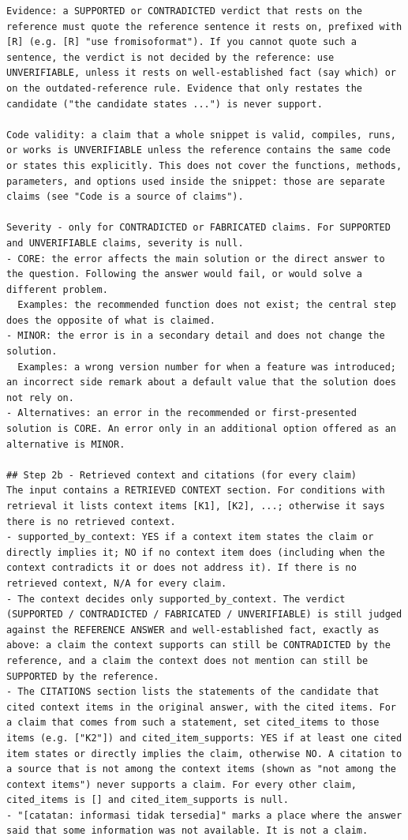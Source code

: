 \begin{lstlisting}
Evidence: a SUPPORTED or CONTRADICTED verdict that rests on the reference must quote the reference sentence it rests on, prefixed with [R] (e.g. [R] "use fromisoformat"). If you cannot quote such a sentence, the verdict is not decided by the reference: use UNVERIFIABLE, unless it rests on well-established fact (say which) or on the outdated-reference rule. Evidence that only restates the candidate ("the candidate states ...") is never support.

Code validity: a claim that a whole snippet is valid, compiles, runs, or works is UNVERIFIABLE unless the reference contains the same code or states this explicitly. This does not cover the functions, methods, parameters, and options used inside the snippet: those are separate claims (see "Code is a source of claims").

Severity - only for CONTRADICTED or FABRICATED claims. For SUPPORTED and UNVERIFIABLE claims, severity is null.
- CORE: the error affects the main solution or the direct answer to the question. Following the answer would fail, or would solve a different problem.
  Examples: the recommended function does not exist; the central step does the opposite of what is claimed.
- MINOR: the error is in a secondary detail and does not change the solution.
  Examples: a wrong version number for when a feature was introduced; an incorrect side remark about a default value that the solution does not rely on.
- Alternatives: an error in the recommended or first-presented solution is CORE. An error only in an additional option offered as an alternative is MINOR.

## Step 2b - Retrieved context and citations (for every claim)
The input contains a RETRIEVED CONTEXT section. For conditions with retrieval it lists context items [K1], [K2], ...; otherwise it says there is no retrieved context.
- supported_by_context: YES if a context item states the claim or directly implies it; NO if no context item does (including when the context contradicts it or does not address it). If there is no retrieved context, N/A for every claim.
- The context decides only supported_by_context. The verdict (SUPPORTED / CONTRADICTED / FABRICATED / UNVERIFIABLE) is still judged against the REFERENCE ANSWER and well-established fact, exactly as above: a claim the context supports can still be CONTRADICTED by the reference, and a claim the context does not mention can still be SUPPORTED by the reference.
- The CITATIONS section lists the statements of the candidate that cited context items in the original answer, with the cited items. For a claim that comes from such a statement, set cited_items to those items (e.g. ["K2"]) and cited_item_supports: YES if at least one cited item states or directly implies the claim, otherwise NO. A citation to a source that is not among the context items (shown as "not among the context items") never supports a claim. For every other claim, cited_items is [] and cited_item_supports is null.
- "[catatan: informasi tidak tersedia]" marks a place where the answer said that some information was not available. It is not a claim.


\end{lstlisting}
